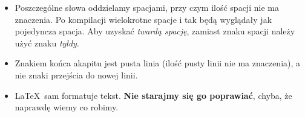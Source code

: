 \begin{itemize}
\item
Poszczególne słowa oddzielamy spacjami, przy czym ilość spacji nie ma znaczenia.
Po kompilacji wielokrotne spacje i tak będą wyglądały jak pojedyncza spacja.
Aby uzyskać {\em twardą spację}, zamiast znaku spacji należy użyć znaku {\em
tyldy}.

\item
Znakiem końca akapitu jest pusta linia (ilość pusty linii nie ma znaczenia), a
nie znaki przejścia do nowej linii.

\item
\LaTeX~sam formatuje tekst. \textbf{Nie starajmy się go poprawiać}, chyba, że
naprawdę wiemy co robimy.
\end{itemize} 


